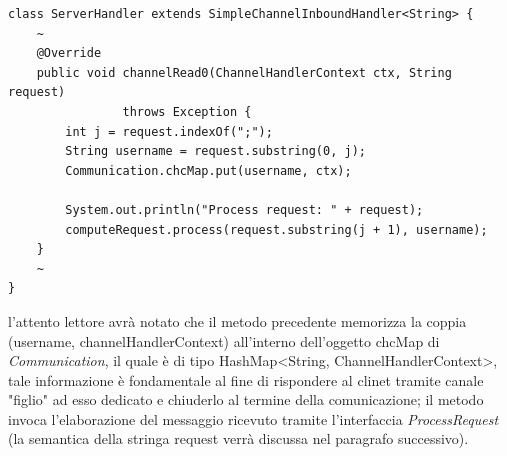 \begin{lstlisting}
class ServerHandler extends SimpleChannelInboundHandler<String> {
	~
	@Override
	public void channelRead0(ChannelHandlerContext ctx, String request)
				throws Exception {
		int j = request.indexOf(";");
		String username = request.substring(0, j);
		Communication.chcMap.put(username, ctx);
		
		System.out.println("Process request: " + request);
		computeRequest.process(request.substring(j + 1), username);
	}
	~
}
\end{lstlisting}
l'attento lettore avrà notato che il metodo precedente memorizza la coppia (username, channelHandlerContext) all'interno dell'oggetto chcMap di \textit{Communication}, il quale è di tipo HashMap<String, ChannelHandlerContext>, tale informazione è fondamentale al fine di rispondere al clinet tramite canale "figlio" ad esso dedicato e chiuderlo al termine della comunicazione; il metodo invoca l'elaborazione del messaggio ricevuto tramite l'interfaccia \textit{ProcessRequest} (la semantica della stringa request verrà discussa nel paragrafo successivo).



